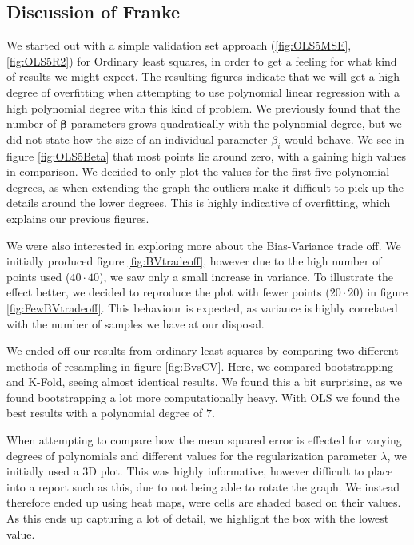 \documentclass{article}
\begin{document}
\subsection{Discussion of Franke}
We started out with a simple validation set approach (\ref{fig:OLS5MSE}, \ref{fig:OLS5R2}) for Ordinary least squares, in order to get a feeling for what kind of results we might expect. The resulting figures indicate that we will get a high degree of overfitting when attempting to use polynomial linear regression with a high polynomial degree with this kind of problem. We previously found that the number of $\boldsymbol{\beta}$ parameters grows quadratically with the polynomial degree, but we did not state how the size of an individual parameter $\beta_i$ would behave. We see in figure \ref{fig:OLS5Beta} that most points lie around zero, with a gaining high values in comparison. We decided to only plot the values for the first five polynomial degrees, as when extending the graph the outliers make it difficult to pick up the details around the lower degrees. This is highly indicative of overfitting, which explains our previous figures.

We were also interested in exploring more about the Bias-Variance trade off. We initially produced figure \ref{fig:BVtradeoff}, however due to the high number of points used ($40 \cdot 40$), we saw only a small increase in variance. To illustrate the effect better, we decided to reproduce the plot with fewer points ($20 \cdot 20$) in figure \ref{fig:FewBVtradeoff}. This behaviour is expected, as variance is highly correlated with the number of samples we have at our disposal.

We ended off our results from ordinary least squares by comparing two different methods of resampling in figure \ref{fig:BvsCV}. Here, we compared bootstrapping and K-Fold, seeing almost identical results. We found this a bit surprising, as we found bootstrapping a lot more computationally heavy. With OLS we found the best results with a polynomial degree of $7$.

When attempting to compare how the mean squared error is effected for varying degrees of polynomials and different values for the regularization parameter $\lambda$, we initially used a 3D plot. This was highly informative, however difficult to place into a report such as this, due to not being able to rotate the graph. We instead therefore ended up using heat maps, were cells are shaded based on their values. As this ends up capturing a lot of detail, we highlight the box with the lowest value.
\end{document}
